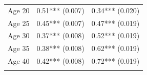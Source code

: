 \documentclass[]{article}
\begin{document}
\begin{longtable}[c]{@{}rrr@{}}
\begin{minipage}[t]{0.24\columnwidth}
Age 20
\strut\end{minipage} &
\begin{minipage}[t]{0.24\columnwidth}\raggedleft\strut
0.51*** (0.007)
\strut\end{minipage} &
\begin{minipage}[t]{0.24\columnwidth}\raggedleft\strut
0.34*** (0.020)
\strut\end{minipage}\tabularnewline
\begin{minipage}[t]{0.24\columnwidth}\raggedleft\strut
Age 25
\strut\end{minipage} &
\begin{minipage}[t]{0.24\columnwidth}\raggedleft\strut
0.45*** (0.007)
\strut\end{minipage} &
\begin{minipage}[t]{0.24\columnwidth}\raggedleft\strut
0.47*** (0.019)
\strut\end{minipage}\tabularnewline
\begin{minipage}[t]{0.24\columnwidth}\raggedleft\strut
Age 30
\strut\end{minipage} &
\begin{minipage}[t]{0.24\columnwidth}\raggedleft\strut
0.37*** (0.008)
\strut\end{minipage} &
\begin{minipage}[t]{0.24\columnwidth}\raggedleft\strut
0.52*** (0.019)
\strut\end{minipage}\tabularnewline
\begin{minipage}[t]{0.24\columnwidth}\raggedleft\strut
Age 35
\strut\end{minipage} &
\begin{minipage}[t]{0.24\columnwidth}\raggedleft\strut
0.38*** (0.008)
\strut\end{minipage} &
\begin{minipage}[t]{0.24\columnwidth}\raggedleft\strut
0.62*** (0.019)
\strut\end{minipage}\tabularnewline
\begin{minipage}[t]{0.24\columnwidth}\raggedleft\strut
Age 40
\strut\end{minipage} &
\begin{minipage}[t]{0.24\columnwidth}\raggedleft\strut
0.42*** (0.008)
\strut\end{minipage} &
\begin{minipage}[t]{0.24\columnwidth}\raggedleft\strut
0.72*** (0.019)
\strut\end{minipage}\tabularnewline
\begin{minipage}[t]{0.24\columnwidth}\raggedleft\strut

\end{minipage}
\end{longtable}
\end{document}
